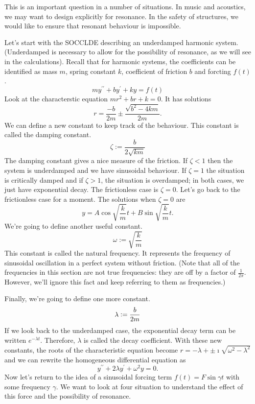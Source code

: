 \documentclass[fleqn,letterpaper]{report}
\begin{document}
This is an important question in a number of situations. In
music and acoustics, we may want to design explicitly for
resonance. In the safety of structures, we would like to
ensure that resonant behaviour is impossible. 

Let's start with the SOCCLDE describing an underdamped
harmonic system. (Underdamped is necessary to allow for the
possibility of resonance, as we will see in the calculations).
Recall that for harmonic systems, the coefficients can be
identified as mass $m$, spring constant $k$, coefficient of
friction $b$ and forcting $f(t)$.
\begin{equation*}
m y^{\prime \prime} + b y^{\prime} + ky = f(t)
\end{equation*}
Look at the characterstic equation $mr^2 + br + k=0$. It has
solutions 
\begin{equation*}
r = \frac{-b}{2m} \pm \frac{\sqrt{b^2-4km}}{2m}.
\end{equation*}
We can define a new constant to keep track of the behaviour.
This constant is called the damping constant.
\begin{equation*}
\zeta := \frac{b}{2\sqrt{km}} 
\end{equation*}
The damping constant gives a nice measure of the friction. If
$\zeta < 1$ then the system is underdamped and we have
sinusoidal behaviour. If $\zeta = 1$ the situation is
critically damped and if $\zeta > 1$, the situation is
overdamped; in both cases, we just have exponential decay.
The frictionless case is $\zeta = 0$. Let's go back to the
frictionless case for a moment. The solutions when $\zeta =
0$ are 
\begin{equation*}
y = A \cos \sqrt{\frac{k}{m}} t + B \sin \sqrt{\frac{k}{m}} t.
\end{equation*}
We're going to define another useful constant.
\begin{equation*}
\omega := \sqrt{\frac{k}{m}}
\end{equation*}
This constant is called the natural frequency. It represents
the frequency of sinusoidal oscillation in a perfect system
without friction. (Note that all of the frequencies in this
section are not true frequencies: they are off by a factor of
$\frac{1}{2\pi}$. However, we'll ignore this fact and keep
referring to them as frequencies.)

Finally, we're going to define one more constant.
\begin{equation*}
\lambda \mathrel{\mathop:}= \frac{b}{2m}
\end{equation*}
If we look back to the underdamped case, the exponential decay
term can be written $e^{-\lambda t}$. Therefore, $\lambda$ is
called the decay coefficient. With these new constants, the
roots of the characteristic equation become $r = -\lambda +\pm
\imath \sqrt{\omega^2 - \lambda^2}$ and we can rewrite the
homogeneous differential equation as
\begin{equation*}
y^{\prime \prime} + 2\lambda y^\prime + \omega^2 y = 0.
\end{equation*}
Now let's return to the idea of a sinusoidal forcing term
$f(t) = F\sin \gamma t$ with some frequency $\gamma$.  We want
to look at four situation to understand the effect of this
force and the possibility of resonance.
\end{document}
